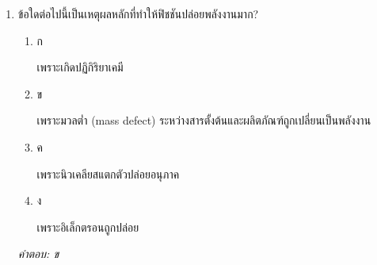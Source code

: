 \documentclass[12pt]{article}
\begin{document}
\begin{enumerate}[label=\arabic*., itemsep=0.5\baselineskip, topsep=0.5\baselineskip, leftmargin=*]
\item ข้อใดต่อไปนี้เป็นเหตุผลหลักที่ทำให้ฟิชชันปล่อยพลังงานมาก?
\begin{enumerate}[label=\alph*)., itemsep=0.3\baselineskip, topsep=0.3\baselineskip]
\item ก\ 
\begin{minipage}[t]{0.9\linewidth}
\raggedright เพราะเกิดปฏิกิริยาเคมี
\end{minipage}
\item ข\ 
\begin{minipage}[t]{0.9\linewidth}
\raggedright เพราะมวลต่ำ (mass defect) ระหว่างสารตั้งต้นและผลิตภัณฑ์ถูกเปลี่ยนเป็นพลังงาน
\end{minipage}
\item ค\ 
\begin{minipage}[t]{0.9\linewidth}
\raggedright เพราะนิวเคลียสแตกตัวปล่อยอนุภาค
\end{minipage}
\item ง\ 
\begin{minipage}[t]{0.9\linewidth}
\raggedright เพราะอิเล็กตรอนถูกปล่อย
\end{minipage}
\end{enumerate}
\vspace{-0.3\baselineskip}
\begin{small}
\textit{คำตอบ: ข}
\end{small}

\end{enumerate}
\end{document}
